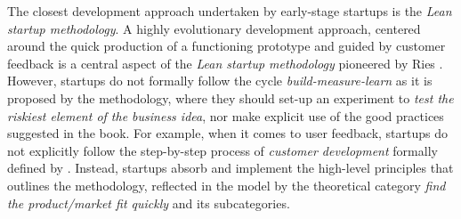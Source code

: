 \documentclass[10pt,journal,letterpaper,compsoc]{IEEEtran}
\begin{document}
\begin{compactitem}
\item The closest development approach undertaken by early-stage startups is the \textit{Lean startup methodology}.  A highly evolutionary development approach, centered around the quick production of a functioning prototype and guided by customer feedback is a central aspect of the \textit{Lean startup methodology} pioneered by Ries \cite{Ries2011}. However, startups do not formally follow the cycle \textit{build-measure-learn} as it is proposed by the methodology, where they should set-up an experiment to \textit{test the riskiest element of the business idea}, nor make explicit use of the good practices suggested in the book. For example, when it comes to user feedback, startups do not explicitly follow the step-by-step process of \textit{customer development} formally defined by \cite{Blank2005}. Instead, startups absorb and implement the high-level principles that outlines the methodology, reflected in the model by the theoretical category \textit{find the product/market fit quickly} and its 
subcategories.


\end{compactitem}
\end{document}
